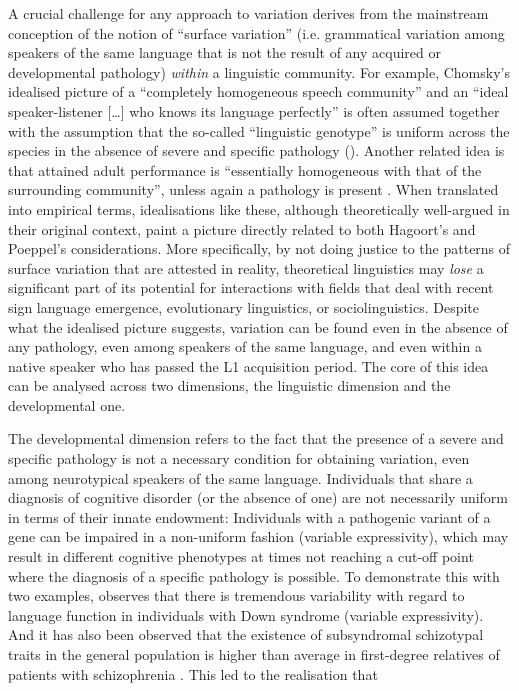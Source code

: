 \documentclass[output=paper]{langsci/langscibook}
\begin{document}
A crucial challenge for any approach to variation derives from the mainstream
conception of the notion of \enquote{surface variation} (i.e. grammatical variation
among speakers of the same language that is not the result of any acquired or
developmental pathology) \emph{within} a linguistic community. For example,
Chomsky’s idealised picture of a “completely homogeneous speech community” and
an “ideal speaker-listener […] who knows its language perfectly”
\citep[3]{Chomsky1965} is often assumed together with the assumption that the
so-called \enquote{linguistic genotype} is uniform across the species in the absence of
severe and specific pathology (\citealt{AndLigh2000}). Another
related idea is that attained adult performance is “essentially homogeneous
with that of the surrounding community”, unless again a pathology is present
\parencite[698]{AndLigh2000}. When translated into empirical terms,
idealisations like these, although theoretically well-argued in their original
context, paint a picture directly related to both Hagoort’s and Poeppel’s
considerations. More specifically, by not doing justice to the patterns of
surface variation that are attested in reality, theoretical linguistics may
\emph{lose} a significant part of its potential for interactions with fields
that deal with recent sign language emergence, evolutionary linguistics, or
sociolinguistics. Despite what the idealised picture suggests, variation can be
found even in the absence of any pathology, even among speakers of the same
language, and even within a native speaker who has passed the L1 acquisition
period. The core of this idea can be analysed across two dimensions, the
linguistic dimension and the developmental one.

The developmental dimension refers to the fact that the presence of a severe
and specific pathology is not a necessary condition for obtaining variation,
even among neurotypical speakers of the same language. Individuals that share a
diagnosis of cognitive disorder (or the absence of one) are not necessarily
uniform in terms of their innate endowment: Individuals with a pathogenic
variant of a gene can be impaired in a non-uniform fashion (variable
expressivity), which may result in different cognitive phenotypes at times not
reaching a cut-off point where the diagnosis of a specific pathology is
possible. To demonstrate this with two examples, \citet{Fowler1995} observes
that there is tremendous variability with regard to language function in
individuals with Down syndrome (variable expressivity). And it has also been
observed that the existence of subsyndromal schizotypal traits in the general
population is higher than average in first-degree relatives of patients with
schizophrenia \citep{CalkinsEtAl2004}. This led to the realisation that
\end{document}
